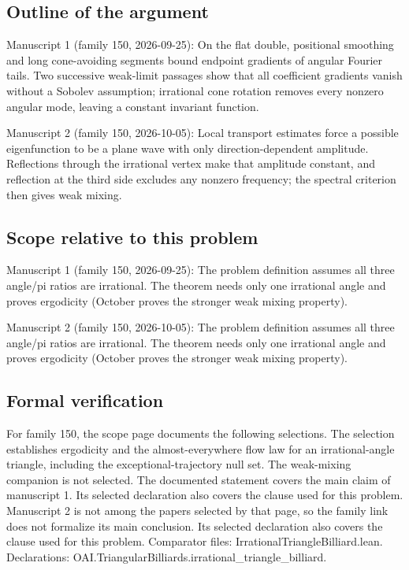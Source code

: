 \documentclass[11pt]{article}
\begin{document}
\subsection{Outline of the argument}
Manuscript 1 (family 150, 2026-09-25): On the flat double, positional smoothing and long cone-avoiding segments bound endpoint gradients of angular Fourier tails. Two successive weak-limit passages show that all coefficient gradients vanish without a Sobolev assumption; irrational cone rotation removes every nonzero angular mode, leaving a constant invariant function.

Manuscript 2 (family 150, 2026-10-05): Local transport estimates force a possible eigenfunction to be a plane wave with only direction-dependent amplitude. Reflections through the irrational vertex make that amplitude constant, and reflection at the third side excludes any nonzero frequency; the spectral criterion then gives weak mixing.

\subsection{Scope relative to this problem}
Manuscript 1 (family 150, 2026-09-25): The problem definition assumes all three angle/pi ratios are irrational. The theorem needs only one irrational angle and proves ergodicity (October proves the stronger weak mixing property).

Manuscript 2 (family 150, 2026-10-05): The problem definition assumes all three angle/pi ratios are irrational. The theorem needs only one irrational angle and proves ergodicity (October proves the stronger weak mixing property).

\subsection{Formal verification}
For family 150, the scope page documents the following selections. The selection establishes ergodicity and the almost-everywhere flow law for an irrational-angle triangle, including the exceptional-trajectory null set. The weak-mixing companion is not selected. The documented statement covers the main claim of manuscript 1. Its selected declaration also covers the clause used for this problem. Manuscript 2 is not among the papers selected by that page, so the family link does not formalize its main conclusion. Its selected declaration also covers the clause used for this problem. Comparator files: IrrationalTriangleBilliard.lean. Declarations: OAI.TriangularBilliards.irrational\_triangle\_billiard.
\end{document}
